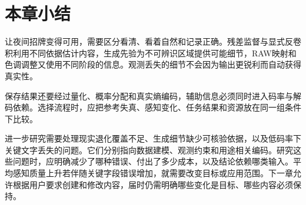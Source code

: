 \section{本章小结}
\label{sec:vision-restoration-summary}

让夜间招牌变得可用，需要区分看清、看着自然和记录正确。残差监督与显式反卷积利用不同依据估计内容，生成先验为不可辨识区域提供可能细节，RAW映射和色调调整又使用不同阶段的信息。观测丢失的细节不会因为输出更锐利而自动获得真实性。

保存结果还要经过量化、概率分配和真实熵编码，辅助信息必须同时进入码率与解码依赖。选择流程时，应把参考失真、感知变化、任务结果和资源放在同一组条件下比较。

进一步研究需要处理现实退化覆盖不足、生成细节缺少可核验依据，以及低码率下关键文字丢失的问题。它们分别指向数据建模、观测约束和用途相关编码。研究这些问题时，应明确减少了哪种错误、付出了多少成本，以及结论依赖哪类输入。平均感知质量上升若伴随关键字段错误增加，就需要改变目标或应用范围。下一章允许根据用户要求创建和修改内容，届时仍需明确哪些变化是目标、哪些内容必须保持。
